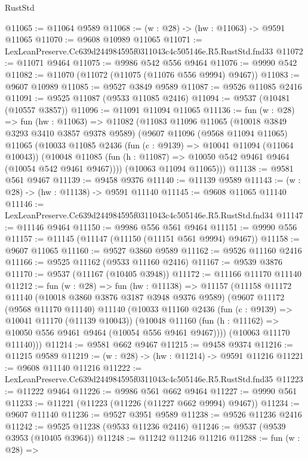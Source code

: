 \begin{lexlean}{RustStd}
\begin{coremodule}
@11065 := @11064 @9589
@11068 := (w : @28) -> (hw : @11063) -> @9591 @11065
@11070 := @9608 @10989 @11065
@11071 := LexLeanPreserve.Cc639d244984595f0311043c4c505146e.R5.RustStd.fnd33
@11072 := @11071 @9464
@11075 := @9986 @542 @556 @9464
@11076 := @9990 @542
@11082 := @11070 (@11072 (@11075 (@11076 @556 @9994) @9467))
@11083 := @9607 @10989
@11085 := @9527 @3849 @9589
@11087 := @9526 @11085 @2416
@11091 := @9525 @11087 (@9533 @11085 @2416)
@11094 := @9537 (@10481 (@10557 @3857))
@11096 := @11091 @11094 @11065
@11136 := fun (w : @28) =>
  fun (hw : @11063) =>
  @11082
    (@11083
      @11096
      @11065
      (@10018 @3849 @3293 @3410 @3857 @9378 @9589)
      (@9607
        @11096
        (@9568 @11094 @11065)
        @11065
        (@10033
          @11085
          @2436
          (fun (c : @9139) => @10041 @11094 (@11064 @10043))
          (@10048 @11085 (fun (h : @11087) => @10050 @542 @9461 @9464 (@10054 @542 @9461 @9467))))
        (@10063 @11094 @11065)))
@11138 := @9581 @561 @9467
@11139 := @9458 @9376
@11140 := @11139 @9589
@11143 := (w : @28) -> (hw : @11138) -> @9591 @11140
@11145 := @9608 @11065 @11140
@11146 := LexLeanPreserve.Cc639d244984595f0311043c4c505146e.R5.RustStd.fnd34
@11147 := @11146 @9464
@11150 := @9986 @556 @561 @9464
@11151 := @9990 @556
@11157 := @11145 (@11147 (@11150 (@11151 @561 @9994) @9467))
@11158 := @9607 @11065
@11160 := @9527 @3860 @9589
@11162 := @9526 @11160 @2416
@11166 := @9525 @11162 (@9533 @11160 @2416)
@11167 := @9539 @3876
@11170 := @9537 (@11167 (@10405 @3948))
@11172 := @11166 @11170 @11140
@11212 := fun (w : @28) =>
  fun (hw : @11138) =>
  @11157
    (@11158
      @11172
      @11140
      (@10018 @3860 @3876 @3187 @3948 @9376 @9589)
      (@9607
        @11172
        (@9568 @11170 @11140)
        @11140
        (@10033
          @11160
          @2436
          (fun (c : @9139) => @10041 @11170 (@11139 @10043))
          (@10048 @11160 (fun (h : @11162) => @10050 @556 @9461 @9464 (@10054 @556 @9461 @9467))))
        (@10063 @11170 @11140)))
@11214 := @9581 @662 @9467
@11215 := @9458 @9374
@11216 := @11215 @9589
@11219 := (w : @28) -> (hw : @11214) -> @9591 @11216
@11221 := @9608 @11140 @11216
@11222 := LexLeanPreserve.Cc639d244984595f0311043c4c505146e.R5.RustStd.fnd35
@11223 := @11222 @9464
@11226 := @9986 @561 @662 @9464
@11227 := @9990 @561
@11233 := @11221 (@11223 (@11226 (@11227 @662 @9994) @9467))
@11234 := @9607 @11140
@11236 := @9527 @3951 @9589
@11238 := @9526 @11236 @2416
@11242 := @9525 @11238 (@9533 @11236 @2416)
@11246 := @9537 (@9539 @3953 (@10405 @3964))
@11248 := @11242 @11246 @11216
@11288 := fun (w : @28) =>

\end{coremodule}
\end{lexlean}
